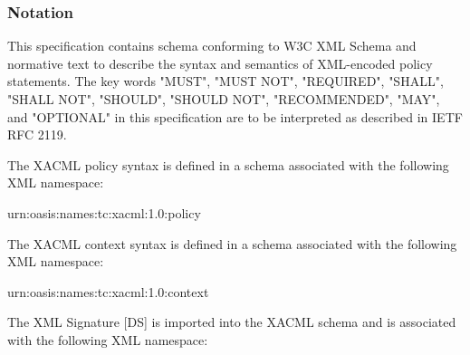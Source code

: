 \subsubsection{Notation} 
\hspace{5mm}This specification contains schema conforming to W3C XML Schema and normative text to describe the syntax and semantics of XML-encoded policy statements.
The key words "MUST", "MUST NOT", "REQUIRED", "SHALL", "SHALL NOT", "SHOULD",
"SHOULD NOT", "RECOMMENDED", "MAY", and "OPTIONAL" in this specification are to be
interpreted as described in IETF RFC 2119.
\par The XACML policy syntax is defined in a schema associated with the following XML namespace:
\begin{center}
urn:oasis:names:tc:xacml:1.0:policy
\end{center} 
The XACML context syntax is defined in a schema associated with the following XML namespace:
\begin{center}
urn:oasis:names:tc:xacml:1.0:context
\end{center}
The XML Signature [DS] is imported into the XACML schema and is associated with the following XML namespace:


